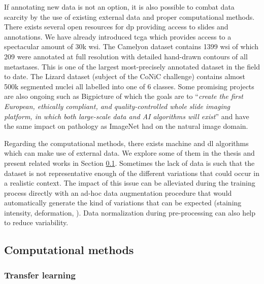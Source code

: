If annotating new data is not an option, it is also possible to combat data scarcity by the use of existing external data and proper computational methods. There exists several open resources for \acrlong{dp} \parencite{maree2019open} providing access to slides and annotations. We have already introduced \acrshort{tcga} which provides access to a spectacular amount of 30k \acrshort{wsi}. The Camelyon dataset \parencite{litjens2018camelyon} contains 1399 \acrshort{wsi} of which 209 were annotated at full resolution with detailed hand-drawn contours of all metastases. This is one of the largest most-precisely annotated dataset in the field to date. The Lizard dataset (subject of the CoNiC challenge) contains almost 500k segmented nuclei all labelled into one of 6 classes. Some promising projects are also ongoing such as Bigpicture \parencite{moulin2021imi} of which the goals are to ``\textit{create the first European, ethically compliant, and quality-controlled whole slide imaging platform, in which both large-scale data and AI algorithms will exist}'' and have the same impact on pathology as ImageNet had on the natural image domain. 

Regarding the computational methods, there exists machine and \acrlong{dl} algorithms which can make use of external data. We explore some of them in the thesis and present related works in Section \ref{ssec:backdp:compmethods}. Sometimes the lack of data is such that the dataset is not representative enough of the different variations that could occur in a realistic context. The impact of this issue can be alleviated during the training process directly with an ad-hoc data augmentation procedure that would automatically generate the kind of variations that can be expected (\eg staining intensity, deformation, \etc). Data normalization during pre-processing can also help to reduce variability. 



\subsection{Computational methods}
\label{ssec:backdp:compmethods}
\parencite{van2019strategies}


\subsubsection{Transfer learning}
\label{sssec:backdp:tl}

